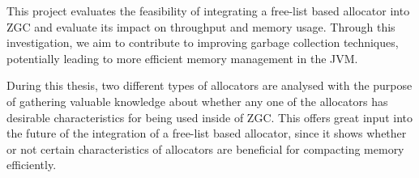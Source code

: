 This project evaluates the feasibility of integrating a free-list based allocator into ZGC and evaluate its impact on throughput and memory usage. Through this investigation, we aim to contribute to improving garbage collection techniques, potentially leading to more efficient memory management in the JVM.

During this thesis, two different types of allocators are analysed with the purpose of gathering valuable knowledge about whether any one of the allocators has desirable characteristics for being used inside of ZGC. This offers great input into the future of the integration of a free-list based allocator, since it shows whether or not certain characteristics of allocators are beneficial for compacting memory efficiently.
